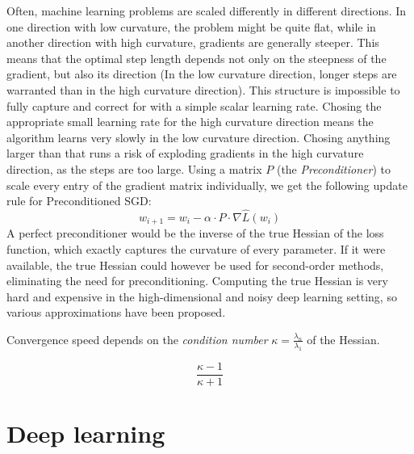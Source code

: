 \documentclass[twoside,12pt,a4paper]{report}
\begin{document}
Often, machine learning problems are scaled differently in different directions. In one direction with low curvature, the problem might be quite flat, while in another direction with high curvature, gradients are generally steeper. This means that the optimal step length depends not only on the steepness of the gradient, but also its direction (In the low curvature direction, longer steps are warranted than in the high curvature direction).
This structure is impossible to fully capture and correct for with a simple scalar learning rate. Chosing the appropriate small learning rate for the high curvature direction means the algorithm learns very slowly in the low curvature direction. Chosing anything larger than that runs a risk of exploding gradients in the high curvature direction, as the steps are too large.
Using a matrix $P$ (the \textit{Preconditioner}) to scale every entry of the gradient matrix individually, we get the following update rule for Preconditioned SGD:
$$w_{i+1} = w_i - \alpha \cdot P \cdot \nabla \hat{L}(w_i) $$
A perfect preconditioner would be the inverse of the true Hessian of the loss function, which exactly captures the curvature of every parameter. If it were available, the true Hessian could however be used for second-order methods, eliminating the need for preconditioning.
Computing the true Hessian is very hard and expensive in the high-dimensional and noisy deep learning setting, so various approximations have been proposed.

Convergence speed depends on the \textit{condition number} $\kappa = \frac{\lambda_n}{\lambda_1}$ of the Hessian.

$$ \frac{\kappa - 1}{\kappa + 1}$$


\section{Deep learning}
\end{document}
